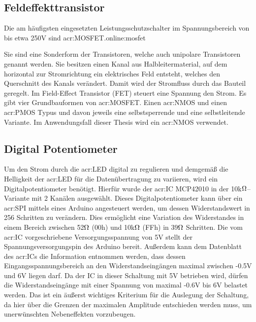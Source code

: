 \newpage
\subsection{Feldeffekttransistor}
\label{subsec:mosfet}
Die am häufigsten eingesetzten Leistungsschutzschalter im Spannungsbereich von bis etwa 250V sind \gls{acr:MOSFET}.\gls{online:mosfet}


Sie sind eine Sonderform der Transistoren, welche auch unipolare Transistoren genannt werden. Sie besitzen einen Kanal aus Halbleitermaterial, auf dem horizontal zur Stromrichtung ein elektrisches Feld entsteht, welches den Querschnitt des Kanals verändert. Damit wird der Stromfluss durch das Bauteil geregelt. Im Field-Effect Transistor (FET) steuert eine Spannung den Strom. Es gibt vier Grundbauformen von \gls{acr:MOSFET}. Einen \gls{acr:NMOS} und einen \gls{acr:PMOS} Typus und davon jeweils eine selbstsperrende und eine selbstleitende Variante. Im Anwendungsfall dieser Thesis wird ein \gls{acr:NMOS} verwendet. \cite{heringElektrotechnikUndElektronik2018}

\newpage
\subsection{Digital Potentiometer}
\label{subsec:digipot}

Um den Strom durch die \gls{acr:LED} digital zu regulieren und demgemäß die Helligkeit der \gls{acr:LED} für die Datenübertragung zu variieren, wird ein Digitalpotentiometer benötigt. Hierfür wurde der \gls{acr:IC} MCP42010 in der 10k$\ohm$–Variante mit 2 Kanälen ausgewählt. Dieses Digitalpotentiometer kann über ein \gls{acr:SPI} mittels eines Arduino angesteuert werden, um dessen Widerstandswert in 256 Schritten zu verändern. Dies ermöglicht eine Variation des Widerstandes in einem Bereich zwischen 52$\ohm$ (00h) und 10k$\ohm$ (FFh) in 39$\ohm$ Schritten. 
Die vom \gls{acr:IC} vorgeschriebene Versorgungsspannung von 5V stellt der Spannungsversorgungspin des Arduino bereit. Außerdem kann dem Datenblatt des \gls{acr:IC}s die Information entnommen werden, dass dessen Eingangsspannungsbereich an den Widerstandseingängen maximal zwischen -0.5V und 6V liegen darf. Da der IC in dieser Schaltung mit 5V betrieben wird, dürfen die Widerstandseingänge mit einer Spannung von maximal -0.6V bis 6V belastet werden. Das ist ein äußerst wichtiges Kriterium für die Auslegung der Schaltung, da hier über die Grenzen der maximalen Amplitude entschieden werden muss, um unerwünschten Nebeneffekten vorzubeugen.

